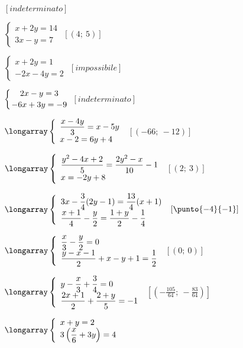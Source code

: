 \begin{esercizio}[\Ast]
\begin{multicols}{2}
\begin{enumeratea}
 \hfill \(\left[indeterminato\right]\)
\item \(\left\{\begin{array}{l}x+2y=14\\3x-y=7\end{array}\right.\)
 \hfill \(\left[(4;~5)\right]\)
\item \(\left\{\begin{array}{l}x+2y=1\\-2x-4y=2\end{array}\right.\)
 \hfill \(\left[impossibile\right]\)
\item \(\left\{\genfrac{}{}{0pt}{0}{2x-y=3}{-6x+3y=-9}\right.\)
 \hfill \(\left[indeterminato\right]\)
 \item \(\longarray\left\{\begin{array}{l}
\dfrac{x-4y}{3}=x-5y\\
x-2=6y+4 \end{array}\right.\)
 \hfill \(\left[(-66;~-12)\right]\)
\item \(\longarray\left\{\begin{array}{l}
\dfrac{y^{2}-4x+2}{5}=\dfrac{2y^{2}-x}{10}-1\\
x=-2y+8\end{array}\right.\)
 \hfill \(\left[(2;~3)\right]\)
\item \(\longarray\left\{\begin{array}{l}
3x-\dfrac{3}{4}(2y-1)=\dfrac{13}{4}(x+1)\\
\dfrac{x+1}{4}-\dfrac{y}{2}=\dfrac{1+y}{2}-\dfrac{1}{4}\end{array}\right.\)
 \hfill \(\left[\punto{-4}{-1}\right]\)
\item \(\longarray\left\{\begin{array}{l}
\dfrac{x}{3}-\dfrac{y}{2}=0\\
\dfrac{y-x-1}{2}+x-y+1=\dfrac{1}{2}\end{array}\right.\)
 \hfill \(\left[(0;~0)\right]\)
\item \(\longarray\left\{\begin{array}{l}
y-\dfrac{x}{3}+\dfrac{3}{4}=0\\
\dfrac{2x+1}{2}+\dfrac{2+y}{5}=-1
\end{array}\right.\)
 \hfill \(\left[\left(-{\frac{105}{64}};~-\frac{83}{64}\right)\right]\)
\item \(\longarray\left\{\begin{array}{l}
x+y=2\\
3\left(\dfrac{x}{6}+3y\right)=4\end{array}\right.\)

\end{enumeratea}
\end{multicols}
\end{esercizio}
